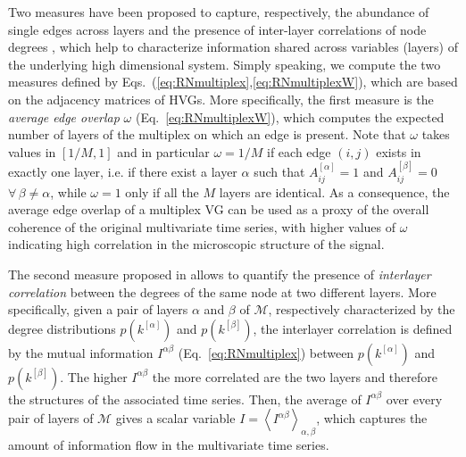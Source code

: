 		Two measures have been proposed to capture, respectively, the abundance of single edges across layers and the presence of inter-layer correlations of node degrees \cite{Lacasa2015b}, which help to characterize information shared across variables (layers) of the underlying high dimensional system. Simply speaking, we compute the two measures defined by Eqs.~(\ref{eq:RNmultiplex},\ref{eq:RNmultiplexW}), which are based on the adjacency matrices of HVGs. More specifically, the first measure is the \textit{average edge overlap} $\omega$ (Eq.~\ref{eq:RNmultiplexW}),  	
which computes the expected number of layers of the multiplex on which an edge is present. Note that $\omega$ takes values in $[1/M, 1]$ and in particular $\omega = 1/M$ if each edge $(i,j)$ exists in exactly one layer, i.e. if there exist a layer $\alpha$ such that $A_{ij}^{[\alpha]} = 1$ and $A_{ij}^{[\beta]} = 0$\, $\forall\, \beta \neq \alpha$, while $\omega = 1$ only if all the $M$ layers are identical. As a consequence, the average edge overlap of a multiplex VG can be used as a proxy of the overall coherence of the original multivariate time series, with higher values of $\omega$ indicating high correlation in the microscopic structure of the signal. 

		The second measure proposed in \cite{Lacasa2015b} allows to quantify the presence of \textit{interlayer correlation} between the degrees of the same node at two different layers. More specifically, given a pair of layers $\alpha$ and $\beta$ of $\mathcal{M}$, respectively characterized by the degree distributions $p(k^{[\alpha]})$ and $p(k^{[\beta]})$, the interlayer correlation is defined by the mutual information $I^{\alpha\beta}$ (Eq.~\ref{eq:RNmultiplex}) between $p(k^{[\alpha]})$ and $p(k^{[\beta]})$. %
		The higher $I^{\alpha\beta}$ the more correlated are the two layers and therefore the structures of the associated time series. Then, the average of $I^{\alpha \beta}$ over every pair of layers of $\mathcal{M}$ gives a scalar variable $I = \left < I^{\alpha\beta}\right>_{\alpha, \beta}$, which captures the amount of information flow in the multivariate time series. 
		
